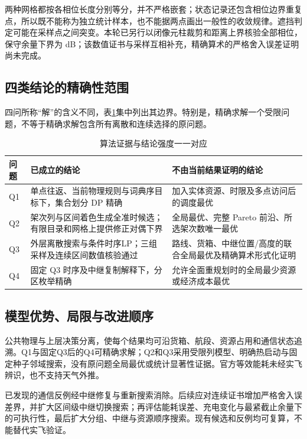 两种网格都按各相位长度分别等分，并不严格嵌套；状态记录还包含相位边界重复点，所以既不能称为独立统计样本，也不能据两点画出一般性的收敛规律。遮挡判定可能在采样点之间突变。本轮已另行以闭像元柱裁剪和距离上界核验全部相位，保守余量下界为\ContinuousMargin{} dB；该数值证书与采样互相补充，精确算术的严格舍入误差证明尚未完成。

\subsection{四类结论的精确性范围}
四问所称“解”的含义不同，表\ref{tab:scope}集中列出其边界。特别是，精确求解一个受限问题，不等于精确求解包含所有离散和连续选择的原问题。
\begin{table}[htbp]\centering\caption{算法证据与结论强度一一对应}\label{tab:scope}
\begin{tabularx}{\linewidth}{lXX}\toprule
问题 & 已成立的结论 & 不由当前结果证明的结论\\\midrule
Q1 & 单点往返、当前物理规则与词典序目标下，集合划分 DP 精确 & 加入实体资源、时限及多点访问后的调度最优\\
Q2 & 架次列与区间着色生成全准时候选；有限目录和网格上提供修正对偶下界 & 全局最优、完整 Pareto 前沿、所选架次数唯一最优\\
Q3 & 外层离散搜索与条件时序LP；三组采样及连续区间数值核验通过 & 路线、货箱、中继位置/高度的联合全局最优及精确算术形式化证明\\
Q4 & 固定 Q3 时序及中继复制解释下，分区枚举精确 & 允许全面重规划时的全局最少资源或经济成本最优\\\bottomrule
\end{tabularx}\end{table}
\FloatBarrier

\subsection{模型优势、局限与改进顺序}
公共物理与上层决策分离，使每个结果均可沿货箱、航段、资源占用和通信状态追溯。Q1与固定Q3后的Q4可精确求解；Q2和Q3采用受限列模型、明确热启动与固定种子邻域搜索，没有原问题全局最优或统计显著性证据。官方等效能耗未经实飞辨识，也不支持天气外推。

已发现的通信反例经中继修复与重新搜索消除。后续应对连续证书增加严格舍入误差界，并扩大区间级中继切换搜索；再评估能耗误差、充电变化与最紧截止余量下的可执行性，最后扩大分组、中继与资源顺序搜索。现有候选和反例均可复算，不能替代实飞验证。
\FloatBarrier
